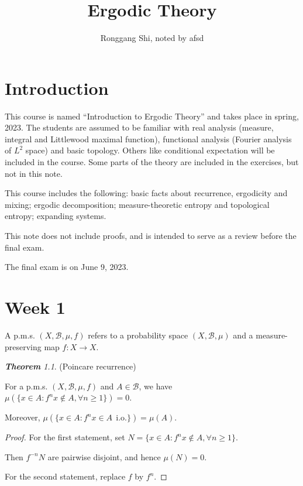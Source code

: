 \documentclass[10pt, a4paper, oneside]{report}
\title{Ergodic Theory}
\author{Ronggang Shi, noted by afsd}
\date{}
\numberwithin{equation}{chapter}
\theoremstyle{remark}
\newtheorem{theorem}[definition]{\bf{Theorem}}
\theoremstyle{remark}
\begin{document}
\setcounter{page}{1}
\maketitle
\tableofcontents \clearpage

\thispagestyle{empty}

\chapter*{Introduction}

    This course is named ``Introduction to Ergodic Theory'' and takes place in spring, 2023. The students are assumed to be familiar with real analysis (measure, integral and Littlewood maximal function), 
    functional analysis (Fourier analysis of $L^2$ space) and basic topology. Others like conditional expectation will be included in the course. Some parts of the theory are included in the exercises, but not in this note.

    This course includes the following: basic facts about recurrence, ergodicity and mixing; ergodic decomposition; measure-theoretic entropy and topological entropy; expanding systems.

    This note does not include proofs, and is intended to serve as a review before the final exam.
    
    The final exam is on June 9, 2023.

\chapter{Week 1}
    A p.m.s. $(X,\mathcal{B},\mu,f)$ refers to a probability space $(X,\mathcal{B},\mu)$ and a measure-preserving map $f:X\rightarrow X$.

\begin{theorem}
    (Poincare recurrence)

    For a p.m.s. $(X,\mathcal{B},\mu,f)$ and $A\in\mathcal{B}$, we have $\mu(\{x\in A:f^nx\notin A,\forall n\geqslant 1\})=0$. 

    Moreover, $\mu(\{x\in A:f^nx\in A~~\text{i.o.}\})=\mu(A).$
\end{theorem}

\begin{proof}
    For the first statement, set $N=\{x\in A:f^nx\notin A,\forall n\geqslant 1\}$.

    Then $f^{-n}N$ are pairwise disjoint, and hence $\mu(N)=0$.

    For the second statement, replace $f$ by $f^n$.
\end{proof}
\end{document}
